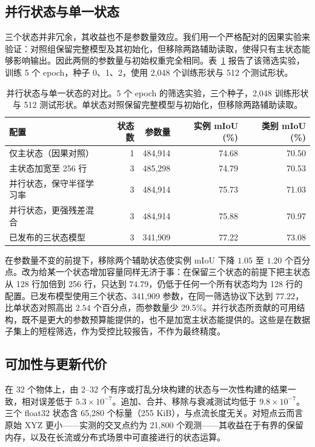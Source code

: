 \documentclass[UTF8,a4paper,11pt,fontset=windows]{ctexart}
\begin{document}
\subsection{并行状态与单一状态}
\label{sec:parallel-cn}
三个状态并非冗余，其收益也不是参数量效应。我们用一个严格配对的因果实验来验证：对照组保留完整模型及其初始化，但移除两路辅助读取，使得只有主状态能够影响输出。因此两侧的参数量与初始权重完全相同。表~\ref{tab:parallel_states_cn} 报告了该筛选实验，训练 5 个 epoch，种子 0、1、2，使用 2,048 个训练形状与 512 个测试形状。

\begin{table}[t]
\centering
\caption{并行状态与单一状态的对比。5 个 epoch 的筛选实验，三个种子，2,048 训练形状与 512 测试形状。单状态对照保留完整模型与初始化，但移除两路辅助读取。}
\label{tab:parallel_states_cn}
\begin{tabular}{lrrrr}
\toprule
配置 & 状态数 & 参数量 & 实例 mIoU (\%) & 类别 mIoU (\%) \\
\midrule
仅主状态（因果对照） & 1 & 484,914 & 74.68 & 70.50 \\
主状态加宽至 256 行 & 3 & 485,298 & 74.79 & 70.53 \\
并行状态，保守半径学习率 & 3 & 484,914 & 75.73 & 71.03 \\
并行状态，更强残差混合 & 3 & 484,914 & 75.88 & 70.97 \\
\midrule
已发布的三状态模型 & 3 & 341,909 & 77.22 & 73.08 \\
\bottomrule
\end{tabular}
\end{table}

在参数量不变的前提下，移除两个辅助状态使实例 mIoU 下降 $1.05$ 至 $1.20$ 个百分点。改为给某一个状态增加容量同样无济于事：在保留三个状态的前提下把主状态从 128 行加倍到 256 行，只达到 $74.79$，仍低于任何一个所有状态均为 128 行的配置。已发布模型使用三个状态、341,909 参数，在同一筛选协议下达到 $77.22$，比单状态对照高出 $2.54$ 个百分点，而参数量少 29.5\%。并行状态所贡献的可用结构，既不是更大的参数预算能提供的，也不是加宽主状态能提供的。这些是在数据子集上的短程筛选，作为受控比较报告，不作为最终精度。

\subsection{可加性与更新代价}
\label{sec:additivity-cn}
在 32 个物体上，由 2--32 个有序或打乱分块构建的状态与一次性构建的结果一致，相对误差低于 $5.3\times10^{-7}$。追加、合并、移除与衰减测试均低于 $9.8\times10^{-7}$。三个 float32 状态含 65,280 个标量（255 KiB），与点流长度无关。对短点云而言原始 XYZ 更小——实测的交叉点约为 21,800 个观测——其收益在于有界的保留内存，以及在长流或分布式场景中可直接进行的状态运算。
\end{document}
